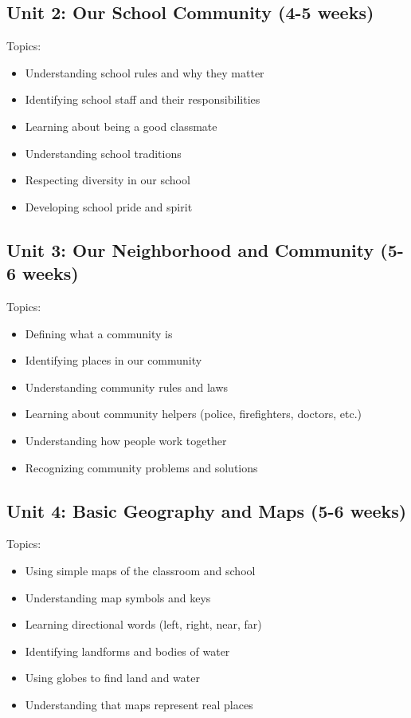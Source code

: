 \documentclass[11pt,letterpaper]{report}
\begin{document}
\subsection{Unit 2: Our School Community (4-5 weeks)}

Topics:
\begin{itemize}
\item Understanding school rules and why they matter
\item Identifying school staff and their responsibilities
\item Learning about being a good classmate
\item Understanding school traditions
\item Respecting diversity in our school
\item Developing school pride and spirit
\end{itemize}

\subsection{Unit 3: Our Neighborhood and Community (5-6 weeks)}

Topics:
\begin{itemize}
\item Defining what a community is
\item Identifying places in our community
\item Understanding community rules and laws
\item Learning about community helpers (police, firefighters, doctors, etc.)
\item Understanding how people work together
\item Recognizing community problems and solutions
\end{itemize}

\subsection{Unit 4: Basic Geography and Maps (5-6 weeks)}

Topics:
\begin{itemize}
\item Using simple maps of the classroom and school
\item Understanding map symbols and keys
\item Learning directional words (left, right, near, far)
\item Identifying landforms and bodies of water
\item Using globes to find land and water
\item Understanding that maps represent real places
\end{itemize}
\end{document}
